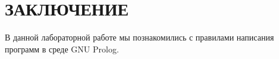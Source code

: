 \section*{ЗАКЛЮЧЕНИЕ}

В данной лабораторной работе мы познакомились с правилами написания программ в среде GNU Prolog.

\newpage